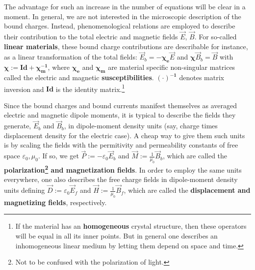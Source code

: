 \documentclass[11pt, a4paper, twoside]{article} %
\begin{document}
The advantage for such an increase in the number of equations will be clear in a moment. In general, we are not interested in the microscopic description of the bound charges. Instead, phenomenological relations are employed to describe their contribution to the total electric and magnetic fields $\vec{E}$, $\vec{B}$. For so-called {\bf linear materials}, these bound charge contributions are describable for instance, as a linear transformation of the total fields: $\vec{E}_b=-\pmb{\chi_e} \vec{E}$ and $\pmb{\chi}\vec{B}_b= \vec{B}$ with $\pmb{\chi}:=\pmb{Id}+\pmb{\chi_m^{-1}}$, where $\pmb{\chi_e}$ and $\pmb{\chi_m}$ are material specific non-singular matrices called the electric and magnetic {\bf susceptibilities}. $\pmb{(\cdot)^{-1}}$ denotes matrix inversion and $\pmb{Id}$ is the identity matrix.\footnote{If the material has an {\bf homogeneous} crystal structure, then these operators will be equal in all its inner points. But in general one describes an inhomogeneous linear medium by letting them depend on space and time. }

Since the bound charges and bound currents manifest themselves as averaged electric and magnetic dipole moments, it is typical to describe the fields they generate, $\vec{E}_b$ and $\vec{B}_b$, in dipole-moment density units (say, charge times displacement density for the electric case). A cheap way to give them such units is by scaling the fields with the permitivity and permeability constants of free space $\varepsilon_0,\mu_0$. If so, we get $\vec{P}:=-\varepsilon_0\vec{E}_b$ and $\vec{M}:=\frac{1}{\mu_0}\vec{B}_b$, which are called the {\bf polarization\footnote{Not to be confused with the polarization of light.} and magnetization fields}. In order to employ the same units everywhere, one also describes the free charge fields in dipole-moment density units defining $\vec{D}:=\varepsilon_0\vec{E}_f$ and $\vec{H}:=\frac{1}{\mu_0}\vec{B}_f$, which are called the {\bf displacement and magnetizing fields}, respectively.
\end{document}
